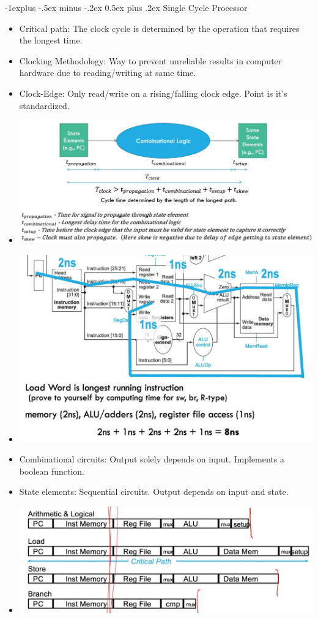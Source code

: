 \documentclass[8pt, landscape]{extarticle}
\makeatletter
\renewcommand{\subsection}{\@startsection{subsection}{2}{0mm}%
  {-1explus -.5ex minus -.2ex}%
  {0.5ex plus .2ex}%
{\normalfont\normalsize\bfseries}}
\makeatother
\begin{document}
\begin{multicols*}{4}
  \subsection{Single Cycle Processor}
  \begin{itemize}
    \item Critical path: The clock cycle is determined by the operation that requires the longest time.
    \item Clocking Methodology: Way to prevent unreliable results in computer hardware due to reading/writing at same time.
    \item Clock-Edge: Only read/write on a rising/falling clock edge. Point is it's standardized.
    \item \includegraphics[width=0.75\linewidth]{clock_cycle.jpg}
    \item \includegraphics[width=0.75\linewidth]{load_word.jpg}
    \item Combinational circuits: Output solely depends on input. Implements a boolean function.
    \item State elements: Sequential circuits. Output depends on input and state.
    \item \includegraphics[width=0.75\linewidth]{single_cycle_time_components.jpg}

\end{itemize}
\end{multicols*}
\end{document}
